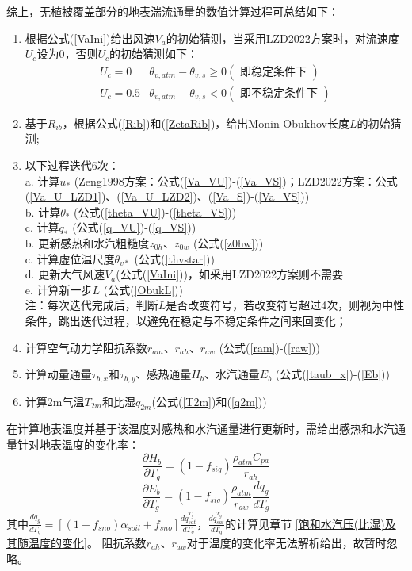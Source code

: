 综上，无植被覆盖部分的地表湍流通量的数值计算过程可总结如下：
\begin{enumerate}
     \item 根据公式(\ref{VaIni})给出风速$V_{a}$的初始猜测，当采用LZD2022方案时，对流速度$U_c$设为0，否则$U_c$的初始猜测如下：
     \begin{equation}
          \begin{array}{cc}U_{c}=0 & \theta_{v, atm}-\theta_{v, s} \geq 0(\text { 即稳定条件下 }) \\ U_{c}=0.5 & \theta_{v, atm}-\theta_{v, s}<0(\text { 即不稳定条件下 })\end{array}
          \end{equation}
     \item 基于$R_{ib}$，根据公式(\ref{Rib})和(\ref{ZetaRib})，给出Monin-Obukhov长度$L$的初始猜测;
     \item 以下过程迭代6次：\\
     a. 计算$u_\ast$ (Zeng1998方案：公式(\ref{Va_VU})-(\ref{Va_VS})；LZD2022方案：公式(\ref{Va_U_LZD1})、(\ref{Va_U_LZD2})、(\ref{Va_S})-(\ref{Va_VS})) \\
     b. 计算$\theta_\ast$ (公式(\ref{theta_VU})-(\ref{theta_VS})) \\
     c. 计算$q_\ast$ (公式(\ref{q_VU})-(\ref{q_VS})) \\
     b. 更新感热和水汽粗糙度$z_{0h}$、$z_{0w}$ (公式(\ref{z0hw})) \\
     c. 计算虚位温尺度$\theta_{v\ast}$ (公式(\ref{thvstar})) \\
     d. 更新大气风速$V_a$(公式(\ref{VaIni}))，如采用LZD2022方案则不需要\\
     e. 计算新一步$L$ (公式(\ref{ObukL})) \\
     注：每次迭代完成后，判断$L$是否改变符号，若改变符号超过4次，则视为中性条件，跳出迭代过程，以避免在稳定与不稳定条件之间来回变化；
     \item 计算空气动力学阻抗系数$r_{am}$、$r_{ah}$、$r_{aw}$ (公式(\ref{ram})-(\ref{raw}))
     \item 计算动量通量$\tau_{b,x}$和$\tau_{b,y}$、感热通量$H_b$、水汽通量$E_b$ (公式(\ref{taub_x})-(\ref{Eb}))
     \item 计算2m气温$T_{2m}$和比湿$q_{2m}$(公式(\ref{T2m})和(\ref{q2m}))
 \end{enumerate}

 在计算地表温度并基于该温度对感热和水汽通量进行更新时，需给出感热和水汽通量针对地表温度的变化率：
\begin{equation}
     \frac{\partial H_{b}}{\partial T_{g}}=\left(1-f_{sig}\right) \frac{\rho_{atm} C_{p a}}{r_{a h}}
\end{equation}
\begin{equation}
     \frac{\partial E_{b}}{\partial T_{g}}=\left(1-f_{sig}\right) \frac{\rho_{atm}}{r_{a w}} \frac{d q_{g}}{d T_{g}}
\end{equation}
其中$\frac{dq_g}{dT_g}=\left[\left(1-f_{sno}\right)\alpha_{soil}+f_{sno}\right]\frac{dq_{sat}^{T_g}}{dT_g}$，$\frac{dq_{sat}^{T_g}}{dT_g}$的计算见章节 \ref{饱和水汽压(比湿)及其随温度的变化}。
阻抗系数$r_{ah}$、$r_{aw}$对于温度的变化率无法解析给出，故暂时忽略。


